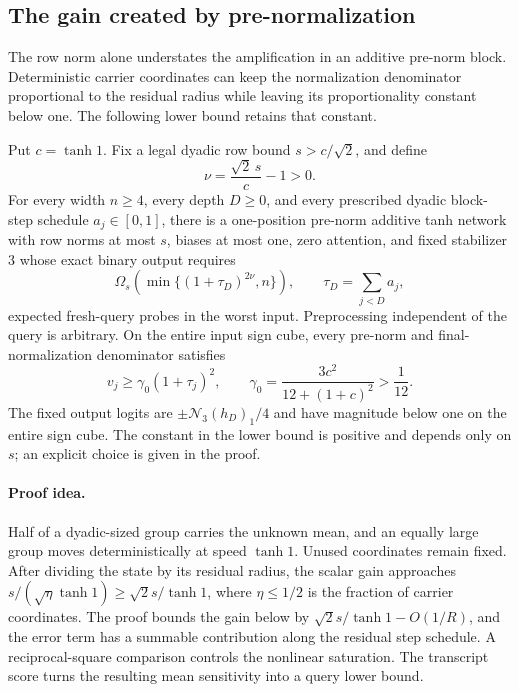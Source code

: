 \subsection{The gain created by pre-normalization}
\label{sec:pn-normalized-gain}

The row norm alone understates the amplification in an additive
pre-norm block. Deterministic carrier coordinates can keep the
normalization denominator proportional to the residual radius while
leaving its proportionality constant below one. The following lower
bound retains that constant.

\begin{theorem}
\label{thm:pn-normalized-gain}
Put $c=\tanh 1$. Fix a legal dyadic row bound
$s>c/\sqrt2$, and define
\[
 \nu=\frac{\sqrt2\,s}{c}-1>0.
\]
For every width $n\ge4$, every depth $D\ge0$, and every prescribed
dyadic block-step schedule $a_j\in[0,1]$, there is a one-position
pre-norm additive tanh network with row norms at most $s$, biases at
most one, zero attention, and fixed stabilizer $3$ whose exact binary
output requires
\[
 \Omega_s\!\left(\min\{(1+\tau_D)^{2\nu},n\}\right),
 \qquad \tau_D=\sum_{j<D}a_j,
\]
expected fresh-query probes in the worst input. Preprocessing
independent of the query is arbitrary. On the entire input sign cube,
every pre-norm and final-normalization denominator satisfies
\[
 v_j\ge\gamma_0(1+\tau_j)^2,
 \qquad
 \gamma_0=\frac{3c^2}{12+(1+c)^2}>\frac1{12}.
\]
The fixed output logits are
$\pm\mathcal N_3(h_D)_1/4$ and have magnitude below one on the
entire sign cube. The constant in the lower bound is positive and
depends only on $s$; an explicit choice is given in the proof.
\end{theorem}

\paragraph{Proof idea.}
Half of a dyadic-sized group carries the unknown mean, and an equally
large group moves deterministically at speed $\tanh1$. Unused
coordinates remain fixed. After dividing the state by its residual
radius, the scalar gain approaches $s/(\sqrt\eta\tanh1)\ge\sqrt2s/\tanh1$,
where $\eta\le1/2$ is the fraction of carrier coordinates. The proof
bounds the gain below by $\sqrt2s/\tanh1-O(1/R)$, and the error term
has a summable contribution along the residual step schedule. A
reciprocal-square comparison controls
the nonlinear saturation. The transcript score turns the resulting
mean sensitivity into a query lower bound.

